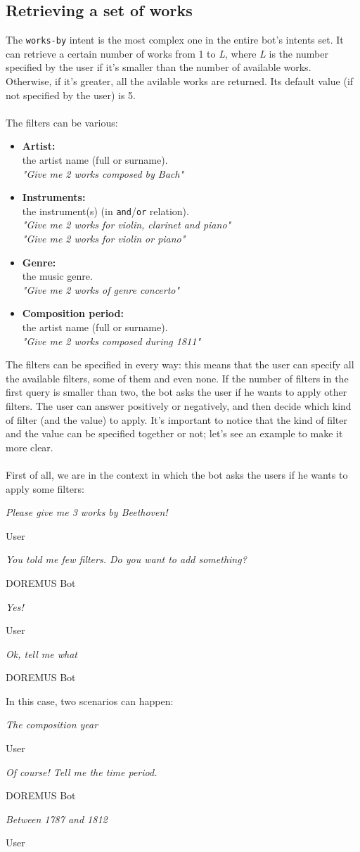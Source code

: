 \documentclass[a4paper,12pt]{report}
\begin{document}
	\subsection{Retrieving a set of works}
	The \texttt{works-by} intent is the most complex one in the entire bot's intents set. It can retrieve a certain number of works from 1 to \textit{L}, where \textit{L} is the number specified by the user if it's smaller than the number of available works. Otherwise, if it's greater, all the avilable works are returned. Its default value (if not specified by the user) is 5.\\\\
	The filters can be various:
	\begin{itemize}
		\item \textbf{Artist:}\\
		the artist name (full or surname).\\
		\textit{"Give me 2 works composed by Bach"}
		
		\item \textbf{Instruments:}\\
		the instrument(s) (in \texttt{and}/\texttt{or} relation).\\
		\textit{"Give me 2 works for violin, clarinet and piano"}\\
		\textit{"Give me 2 works for violin or piano"}
		
		\item \textbf{Genre:}\\
		the music genre.\\
		\textit{"Give me 2 works of genre concerto"}
		
		\item \textbf{Composition period:}\\
		the artist name (full or surname).\\
		\textit{"Give me 2 works composed during 1811"}
		
	\end{itemize}
	The filters can be specified in every way: this means that the user can specify all the available filters, some of them and even none. If the number of filters in the first query is smaller than two, the bot asks the user if he wants to apply other filters. The user can answer positively or negatively, and then decide which kind of filter (and the value) to apply. It's important to notice that the kind of filter and the value can be specified together or not; let's see an example to make it more clear.\\\\
	First of all, we are in the context in which the bot asks the users if he wants to apply some filters:
	\epigraph{\textit{Please give me 3 works by Beethoven!}}{User}
	\epigraph{\textit{You told me few filters. Do you want to add something?}}{DOREMUS Bot}
	\epigraph{\textit{Yes!}}{User}
	\epigraph{\textit{Ok, tell me what}}{DOREMUS Bot}
	In this case, two scenarios can happen:
	\epigraph{\textit{The composition year}}{User}
	\epigraph{\textit{Of course! Tell me the time period.}}{DOREMUS Bot}
	\epigraph{\textit{Between 1787 and 1812}}{User}
	
\end{document}
